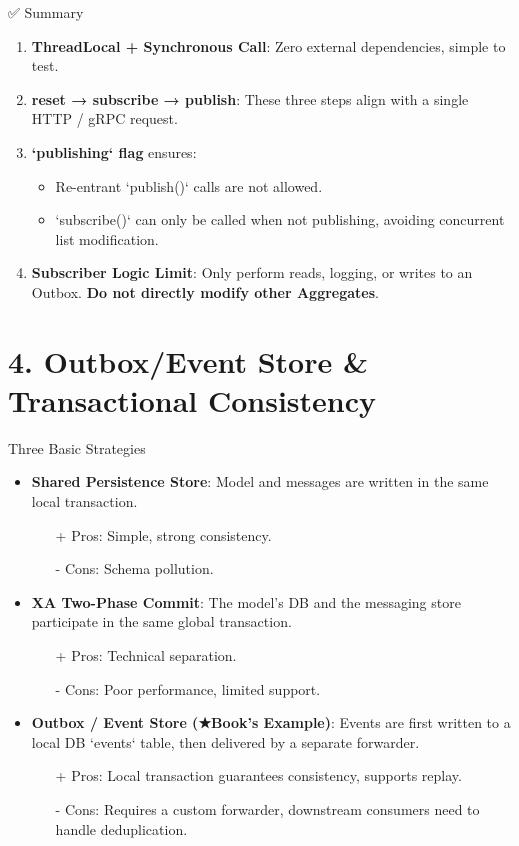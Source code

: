 \documentclass{beamer}
\begin{document}
\begin{frame}{✅ Summary}
  \begin{enumerate}
    \item \textbf{ThreadLocal + Synchronous Call}: Zero external dependencies, simple to test.
    \item \textbf{reset → subscribe → publish}: These three steps align with a single HTTP / gRPC request.
    \item \textbf{`publishing` flag} ensures:
      \begin{itemize}
        \item Re-entrant `publish()` calls are not allowed.
        \item `subscribe()` can only be called when not publishing, avoiding concurrent list modification.
      \end{itemize}
    \item \textbf{Subscriber Logic Limit}: Only perform reads, logging, or writes to an Outbox. \textbf{Do not directly modify other Aggregates}.
  \end{enumerate}
\end{frame}


\section{4. Outbox/Event Store \& Transactional Consistency}

\begin{frame}{Three Basic Strategies}
  \begin{itemize}
    \item<1-> \textbf{Shared Persistence Store}: Model and messages are written in the same local transaction.
      \begin{itemize}
        \item[+] Pros: Simple, strong consistency.
        \item[-] Cons: Schema pollution.
      \end{itemize}
    \item<2-> \textbf{XA Two-Phase Commit}: The model's DB and the messaging store participate in the same global transaction.
      \begin{itemize}
        \item[+] Pros: Technical separation.
        \item[-] Cons: Poor performance, limited support.
      \end{itemize}
    \item<3-> \textbf{Outbox / Event Store (★Book's Example)}: Events are first written to a local DB `events` table, then delivered by a separate forwarder.
      \begin{itemize}
        \item[+] Pros: Local transaction guarantees consistency, supports replay.
        \item[-] Cons: Requires a custom forwarder, downstream consumers need to handle deduplication.
      \end{itemize}
  \end{itemize}
\end{frame}
\end{document}
